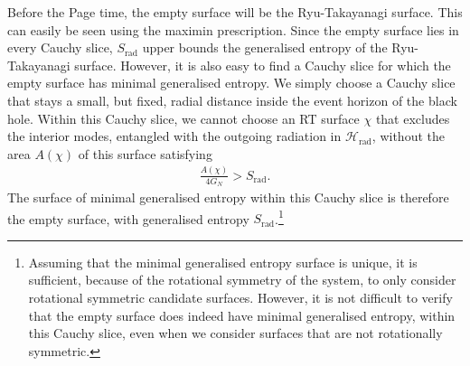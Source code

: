 \documentclass[11pt,a4paper]{article}
\newcommand{\Srad}{S_\text{rad} }
\begin{document}
Before the Page time, the empty surface will be the Ryu-Takayanagi surface. This can easily be seen using the maximin prescription.  Since the empty surface lies in every Cauchy slice, $\Srad$ upper bounds the generalised entropy of the Ryu-Takayanagi surface. However, it is also easy to find a Cauchy slice for which the empty surface has minimal generalised entropy. We simply choose a Cauchy slice that stays a small, but fixed, radial distance inside the event horizon of the black hole. Within this Cauchy slice, we cannot choose an RT surface $\chi$ that excludes the interior modes, entangled with the outgoing radiation in $\mathcal{H}_\text{rad}$, without the area $A(\chi)$ of this surface satisfying
\begin{align}
\frac{A(\chi)}{4 G_N} > \Srad.
\end{align}
The surface of minimal generalised entropy within this Cauchy slice is therefore the empty surface, with generalised entropy $\Srad$.\footnote{Assuming that the minimal generalised entropy surface is unique, it is sufficient, because of the rotational symmetry of the system, to only consider rotational symmetric candidate surfaces. However, it is not difficult to verify that the empty surface does indeed have minimal generalised entropy, within this Cauchy slice, even when we consider surfaces that are not rotationally symmetric.}
\end{document}
